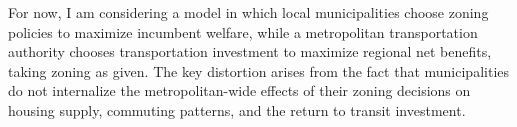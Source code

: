 \documentclass[12pt, a4paper]{article}
\begin{document}
For now, I am considering a model in which local municipalities choose zoning policies to maximize incumbent welfare, while a metropolitan transportation authority chooses transportation investment to maximize regional net benefits, taking zoning as given. The key distortion arises from the fact that municipalities do not internalize the metropolitan-wide effects of their zoning decisions on housing supply, commuting patterns, and the return to transit investment. 







\end{document}
